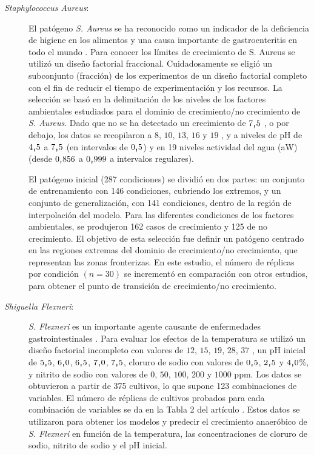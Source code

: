 \begin{description}
\item[\textit{Staphylococcus Aureus}:] El patógeno \textit{S. Aureus} se ha
reconocido como un indicador de la deficiencia de higiene en los alimentos y una causa
importante de gastroenteritis en todo el mundo \cite{Soriano2002}. Para conocer los
límites de crecimiento de S. Aureus \cite{Valero2009} se utilizó un diseño factorial
fraccional. Cuidadosamente se eligió un subconjunto (fracción) de los experimentos de un diseño
factorial completo con el fin de reducir el tiempo de experimentación y los recursos. La selección
se basó en la delimitación de los niveles de los factores ambientales estudiados para el
dominio de crecimiento/no crecimiento de \textit{S. Aureus}. Dado que no se ha
detectado un crecimiento de $7\text{\textquotestraightbase}5$ \textcelsius, o por debajo, los datos
se recopilaron a
$8$, $10$, $13$, $16$ y $19$ \textcelsius, y a niveles de pH de $4\text{\textquotestraightbase}5$ a
$7\text{\textquotestraightbase}5$ (en
intervalos de $0\text{\textquotestraightbase}5$) y en 19 niveles actividad del agua (aW) (desde
$0\text{\textquotestraightbase}856$ a $0\text{\textquotestraightbase}999$ a intervalos regulares).

El patógeno inicial (287 condiciones) se dividió en dos partes: un conjunto de
entrenamiento con 146 condiciones, cubriendo los extremos, y un conjunto de generalización,
con 141 condiciones, dentro de la región de interpolación del modelo. Para las diferentes
condiciones de los factores ambientales, se produjeron 162 casos de crecimiento y 125 de no
crecimiento. El objetivo
de esta selección fue definir un patógeno  centrado en
las regiones extremas del dominio de crecimiento/no crecimiento, que representan
las zonas fronterizas. En este estudio, el número de réplicas por condición $(n=30)$ se
incrementó en comparación con otros estudios, para obtener el punto de transición de
crecimiento/no crecimiento.

\item[\textit{Shiguella Flexneri}:] \textit{S. Flexneri} es un importante agente
	causante de enfermedades gastrointestinales \cite{Zaika1994}. Para evaluar los
efectos de la temperatura se utilizó un diseño factorial incompleto con valores de $12$,
$15$, $19$, $28$, $37$ \textcelsius, un pH inicial de $5\text{\textquotestraightbase}5$,
$6\text{\textquotestraightbase}0$, $6\text{\textquotestraightbase}5$,
$7\text{\textquotestraightbase}0$, $7\text{\textquotestraightbase}5$,
cloruro de sodio con valores de $0\text{\textquotestraightbase}5$, $2\text{\textquotestraightbase}5$
y $4\text{\textquotestraightbase}0$\%, y nitrito de sodio con valores de
$0$, $50$, $100$, $200$ y $1000$ ppm. Los datos se obtuvieron a partir de 375 cultivos, lo
que supone 123 combinaciones de variables. El número de réplicas de cultivos probados para
cada combinación de variables se da en la Tabla 2 del artículo \cite{Zaika1994}. Estos datos se
utilizaron para obtener los modelos y predecir el
crecimiento anaeróbico de \textit{S. Flexneri} en función de la temperatura, las
concentraciones de cloruro de sodio, nitrito de sodio y el pH inicial.


\end{description}
